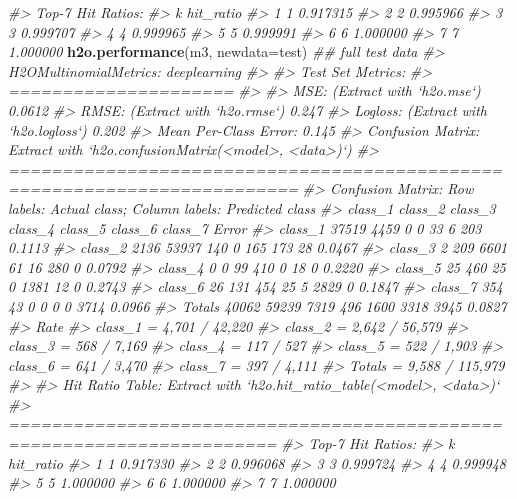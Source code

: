 \documentclass[]{book}
\newenvironment{Shaded}{\begin{snugshade}}{\end{snugshade}}
\newcommand{\CommentTok}[1]{\textcolor[rgb]{0.56,0.35,0.01}{\textit{#1}}}
\newcommand{\DataTypeTok}[1]{\textcolor[rgb]{0.13,0.29,0.53}{#1}}
\newcommand{\KeywordTok}[1]{\textcolor[rgb]{0.13,0.29,0.53}{\textbf{#1}}}
\newcommand{\NormalTok}[1]{#1}
\begin{document}
\begin{Shaded}
\begin{Highlighting}[]
\CommentTok{#> Top-7 Hit Ratios: }
\CommentTok{#>   k hit_ratio}
\CommentTok{#> 1 1  0.917315}
\CommentTok{#> 2 2  0.995966}
\CommentTok{#> 3 3  0.999707}
\CommentTok{#> 4 4  0.999965}
\CommentTok{#> 5 5  0.999991}
\CommentTok{#> 6 6  1.000000}
\CommentTok{#> 7 7  1.000000}
\KeywordTok{h2o.performance}\NormalTok{(m3, }\DataTypeTok{newdata=}\NormalTok{test)     }\CommentTok{## full test data}
\CommentTok{#> H2OMultinomialMetrics: deeplearning}
\CommentTok{#> }
\CommentTok{#> Test Set Metrics: }
\CommentTok{#> =====================}
\CommentTok{#> }
\CommentTok{#> MSE: (Extract with `h2o.mse`) 0.0612}
\CommentTok{#> RMSE: (Extract with `h2o.rmse`) 0.247}
\CommentTok{#> Logloss: (Extract with `h2o.logloss`) 0.202}
\CommentTok{#> Mean Per-Class Error: 0.145}
\CommentTok{#> Confusion Matrix: Extract with `h2o.confusionMatrix(<model>, <data>)`)}
\CommentTok{#> =========================================================================}
\CommentTok{#> Confusion Matrix: Row labels: Actual class; Column labels: Predicted class}
\CommentTok{#>         class_1 class_2 class_3 class_4 class_5 class_6 class_7  Error}
\CommentTok{#> class_1   37519    4459       0       0      33       6     203 0.1113}
\CommentTok{#> class_2    2136   53937     140       0     165     173      28 0.0467}
\CommentTok{#> class_3       2     209    6601      61      16     280       0 0.0792}
\CommentTok{#> class_4       0       0      99     410       0      18       0 0.2220}
\CommentTok{#> class_5      25     460      25       0    1381      12       0 0.2743}
\CommentTok{#> class_6      26     131     454      25       5    2829       0 0.1847}
\CommentTok{#> class_7     354      43       0       0       0       0    3714 0.0966}
\CommentTok{#> Totals    40062   59239    7319     496    1600    3318    3945 0.0827}
\CommentTok{#>                      Rate}
\CommentTok{#> class_1 =  4,701 / 42,220}
\CommentTok{#> class_2 =  2,642 / 56,579}
\CommentTok{#> class_3 =     568 / 7,169}
\CommentTok{#> class_4 =       117 / 527}
\CommentTok{#> class_5 =     522 / 1,903}
\CommentTok{#> class_6 =     641 / 3,470}
\CommentTok{#> class_7 =     397 / 4,111}
\CommentTok{#> Totals  = 9,588 / 115,979}
\CommentTok{#> }
\CommentTok{#> Hit Ratio Table: Extract with `h2o.hit_ratio_table(<model>, <data>)`}
\CommentTok{#> =======================================================================}
\CommentTok{#> Top-7 Hit Ratios: }
\CommentTok{#>   k hit_ratio}
\CommentTok{#> 1 1  0.917330}
\CommentTok{#> 2 2  0.996068}
\CommentTok{#> 3 3  0.999724}
\CommentTok{#> 4 4  0.999948}
\CommentTok{#> 5 5  1.000000}
\CommentTok{#> 6 6  1.000000}
\CommentTok{#> 7 7  1.000000}
\end{Highlighting}
\end{Shaded}
\end{document}
